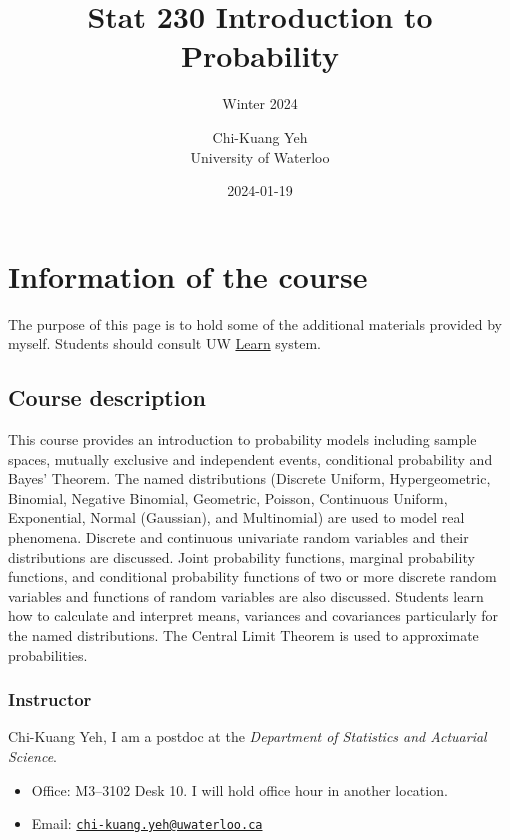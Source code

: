 \documentclass[
]{book}
\title{Stat 230 Introduction to Probability}
\subtitle{Winter 2024}
\author{Chi-Kuang Yeh\\
University of Waterloo}
\date{2024-01-19}
\providecommand{\tightlist}{%
  \setlength{\itemsep}{0pt}\setlength{\parskip}{0pt}}
\theoremstyle{definition}
\theoremstyle{definition}
\theoremstyle{definition}
\theoremstyle{definition}
\theoremstyle{remark}
\begin{document}
\maketitle

{
\setcounter{tocdepth}{1}
\tableofcontents
}
\hypertarget{information-of-the-course}{%
\chapter{Information of the course}\label{information-of-the-course}}

The purpose of this page is to hold some of the additional materials provided by myself. Students should consult UW \href{https://api-4ccc589b.duosecurity.com/frame/v4/preauth/healthcheck?sid=frameless-c0657e9d-cb86-4ac9-a6a7-fd054ae21fd5}{Learn} system.

\hypertarget{course-description}{%
\section{Course description}\label{course-description}}

This course provides an introduction to probability models including sample spaces, mutually exclusive and independent events, conditional probability and Bayes' Theorem. The named distributions (Discrete Uniform, Hypergeometric, Binomial, Negative Binomial, Geometric, Poisson, Continuous Uniform, Exponential, Normal (Gaussian), and Multinomial) are used to model real phenomena. Discrete and continuous univariate random variables and their distributions are discussed. Joint probability functions, marginal probability functions, and conditional probability functions of two or more discrete random variables and functions of random variables are also discussed. Students learn how to calculate and interpret means, variances and covariances particularly for the named distributions. The Central Limit Theorem is used to approximate probabilities.

\hypertarget{instructor}{%
\subsection{Instructor}\label{instructor}}

Chi-Kuang Yeh, I am a postdoc at the \emph{Department of Statistics and Actuarial Science}.

\begin{itemize}
\tightlist
\item
  Office: M3--3102 Desk 10. I will hold office hour in another location.
\item
  Email: \href{mailto:chi-kuang.yeh@uwaterloo.ca}{\nolinkurl{chi-kuang.yeh@uwaterloo.ca}}
\end{itemize}
\end{document}
